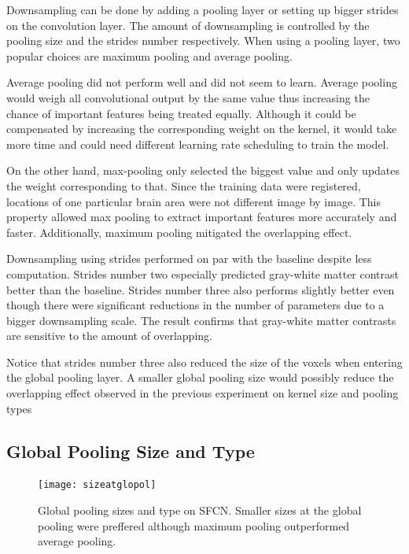 \documentclass{article}
\begin{document}
    Downsampling can be done by adding a pooling layer or setting up bigger strides on the convolution layer. 
    The amount of downsampling is controlled by the pooling size and the strides number respectively. 
    When using a pooling layer, two popular choices are maximum pooling and average pooling.  

    Average pooling did not perform well and did not seem to learn. 
    Average pooling would weigh all convolutional output by the same value thus increasing the chance of important features being treated equally. 
    Although it could be compensated by increasing the corresponding weight on the kernel, it would take more time and could need different learning rate scheduling to train the model.

    On the other hand, max-pooling only selected the biggest value and only updates the weight corresponding to that. 
    Since the training data were registered, locations of one particular brain area were not different image by image. 
    This property allowed max pooling to extract important features more accurately and faster. 
    Additionally, maximum pooling mitigated the overlapping effect.

    Downsampling using strides performed on par with the baseline despite less computation. 
    Strides number two especially predicted gray-white matter contrast better than the baseline. 
    Strides number three also performs slightly better even though there were significant reductions in the number of parameters due to a bigger downsampling scale. 
    The result confirms that gray-white matter contrasts are sensitive to the amount of overlapping.

    Notice that strides number three also reduced the size of the voxels when entering the global pooling layer. 
    A smaller global pooling size would possibly reduce the overlapping effect observed in the previous experiment on kernel size and pooling types

    \subsection*{Global Pooling Size and Type}
    
    \begin{figure}[h]
        \centering
        \texttt{[image: sizeatglopol]}
        \centering
        \caption{
            Global pooling sizes and type on SFCN. 
            Smaller sizes at the global pooling were preffered although maximum pooling outperformed average pooling.}
        \label{fig:glopolsizetype}
    \end{figure}
    
\end{document}
